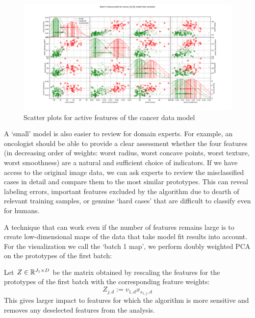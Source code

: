 \begin{figure}
\caption{Scatter plots for active features of the cancer data model}
\label{fig_scatter_plots_cancer}
%
\begin{center}
\includegraphics[width=0.9\textheight, angle=90, trim={1.5cm 1.5cm 1.5cm 0.5cm}, clip]{figures/cancer_scatter_plot_testing_data.pdf}
\end{center}
\end{figure}
%
A `small' model is also easier to review for domain experts.
For example, an oncologist should be able to provide a clear assessment whether the four features (in decreasing order of weights: worst radius, worst concave points, worst texture, worst smoothness) are a natural and sufficient choice of indicators.
If we have access to the original image data, we can ask experts to review the misclassified cases in detail and compare them to the most similar prototypes.
This can reveal labeling errors, important features excluded by the algorithm due to dearth of relevant training samples, or genuine `hard cases' that are difficult to classify even for humans.\par
%
A technique that can work even if the number of features remains large is to create low-dimensional maps of the data that take model fit results into account.
For the visualization we call the `batch 1 map', we perform doubly weighted PCA on the prototypes of the first batch:\par
%
Let $Z\in\mathbb{R}^{J_1\times D}$ be the matrix obtained by rescaling the features for the prototypes of the first batch with the corresponding feature weights:
%
\begin{equation}
Z_{j,d}:=v_{1,d}x_{s_{1,j},d}\label{eq_scaled_x}
\end{equation}
%
This gives larger impact to features for which the algorithm is more sensitive and removes any deselected features from the analysis.
